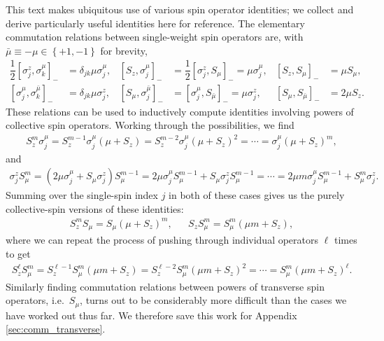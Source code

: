 \documentclass[aps,notitlepage,nofootinbib,11pt]{revtex4-1}
\newcommand{\f}[2]{\dfrac{#1}{#2}} %
\newcommand{\p}[1]{\left(#1\right)} %
\renewcommand{\sp}[1]{\left[#1\right]} %
\renewcommand{\set}[1]{\left\{#1\right\}} %
\newcommand{\bmu}{{\bar\mu}}
\newcommand{\1}{\mathds{1}}
\begin{document}
This text makes ubiquitous use of various spin operator identities; we
collect and derive particularly useful identities here for reference.
The elementary commutation relations between single-weight spin
operators are, with $\bmu\equiv-\mu\in\set{+1,-1}$ for brevity,
\begin{align}
  \f12 \sp{\sigma_j^z,\sigma_k^\mu}_-
  &= \delta_{jk} \mu \sigma_j^\mu,
  &
  \sp{S_z,\sigma_j^\mu}_-
  &= \f12 \sp{\sigma_j^z,S_\mu}_- = \mu \sigma_j^\mu,
  &
  \sp{S_z,S_\mu}_-
  &= \mu S_\mu,
  \label{eq:comm_z_base} \\
  \sp{\sigma_j^\mu,\sigma_k^\bmu}_-
  &= \delta_{jk} \mu \sigma_j^z,
  &
  \sp{S_\mu,\sigma_j^\bmu}_-
  &= \sp{\sigma_j^\mu,S_\bmu}_- = \mu \sigma_j^z,
  &
  \sp{S_\mu,S_\bmu}_-
  &= 2 \mu S_z.
  \label{eq:comm_mu_base}
\end{align}
These relations can be used to inductively compute identities
involving powers of collective spin operators.  Working through the
possibilities, we find
\begin{align}
  S_z^m \sigma_j^\mu
  = S_z^{m-1} \sigma_j^\mu \p{\mu + S_z}
  = S_z^{m-2} \sigma_j^\mu \p{\mu + S_z}^2
  = \cdots
  = \sigma_j^\mu \p{\mu + S_z}^m,
  \label{eq:push_z_mu_Ss}
\end{align}
and
\begin{align}
  \sigma_j^z S_\mu^m
  = \p{2\mu\sigma_j^\mu + S_\mu \sigma_j^z} S_\mu^{m-1}
  = 2\mu\sigma_j^\mu S_\mu^{m-1} + S_\mu \sigma_j^z S_\mu^{m-1}
  = \cdots
  = 2\mu m\sigma_j^\mu S_\mu^{m-1} + S_\mu^m \sigma_j^z.
  \label{eq:push_z_mu_sS}
\end{align}
Summing over the single-spin index $j$ in both of these cases gives us
the purely collective-spin versions of these identities:
\begin{align}
  S_z^m S_\mu = S_\mu \p{\mu + S_z}^m,
  &&
  S_z S_\mu^m = S_\mu^m \p{\mu m + S_z},
  \label{eq:push_z_mu_single}
\end{align}
where we can repeat the process of pushing through individual
operators $\ell$ times to get
\begin{align}
  S_z^\ell S_\mu^m
  = S_z^{\ell-1} S_\mu^m \p{\mu m + S_z}
  = S_z^{\ell-2} S_\mu^m \p{\mu m + S_z}^2
  = \cdots
  = S_\mu^m \p{\mu m + S_z}^\ell.
  \label{eq:push_z_mu}
\end{align}
Similarly finding commutation relations between powers of transverse
spin operators, i.e.~$S_\mu$, turns out to be considerably more
difficult than the cases we have worked out thus far.  We therefore
save this work for Appendix \ref{sec:comm_transverse}.
\end{document}

